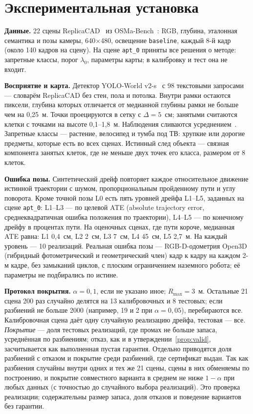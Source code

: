\section{Экспериментальная установка}\label{sec:setup}

\textbf{Данные.} 22 сцены ReplicaCAD~\cite{habitat2} из OSMa-Bench~\cite{osmabench}: RGB, глубина, эталонная семантика и позы камеры, 640$\times$480, освещение \texttt{baseline}, каждый 8-й кадр (около 140 кадров на сцену). На сцене \texttt{apt\_0} приняты все решения о методе: запретные классы, порог $\lambda_0$, параметры карты; в калибровку и тест она не входит.

\textbf{Восприятие и карта.} Детектор YOLO-World v2-s~\cite{yoloworld} с 98 текстовыми запросами --- словарём ReplicaCAD без стен, пола и потолка. Внутри рамки остаются пиксели, глубина которых отличается от медианной глубины рамки не больше чем на 0,25~м. Точки проецируются в сетку с $\Delta = 5$~см; занятыми считаются клетки с точками на высоте 0,1--1,8~м. Наблюдения сливаются усреднением~\cite{overconf}. Запретные классы --- растение, велосипед и тумба под ТВ: хрупкие или дорогие предметы, которые есть во всех сценах. Истинный след объекта --- связная компонента занятых клеток, где не меньше двух точек его класса, размером от 8 клеток.

\textbf{Ошибка позы.} Синтетический дрейф повторяет каждое относительное движение истинной траектории с шумом, пропорциональным пройденному пути и углу поворота. Кроме точной позы L0 есть пять уровней дрейфа L1--L5, заданных на сцене \texttt{apt\_0}: L1--L3 --- по целевой ATE (absolute trajectory error, среднеквадратичная ошибка положения по траектории), L4--L5 --- по конечному дрейфу в процентах пути. На оценочных сценах, где пути короче, медианная ATE равна: L1 0,4~см, L2 2~см, L3 7~см, L4 45~см, L5 2,7~м. На каждый уровень --- 10 реализаций. Реальная ошибка позы --- RGB-D-одометрия Open3D~\cite{open3d} (гибридный фотометрический и геометрический член) кадр к кадру на каждом 2-м кадре, без замыканий циклов, с плоским ограничением наземного робота; её параметры не подбирались по истине.

\textbf{Протокол покрытия.} $\alpha = 0{,}1$, если не указано иное; $R_{\max} = 3$~м. Остальные 21 сцена 200 раз случайно делятся на 13 калибровочных и 8 тестовых; если разбиений не больше 2000 (например, 19 и 2 при $\alpha = 0{,}05$), перебираются все. Калибровочная сцена даёт одну случайную реализацию дрейфа, тестовая --- все. \emph{Покрытие} --- доля тестовых реализаций, где промах не больше запаса, усреднённая по разбиениям; отказ, как и в утверждении~\ref{prop:valid}, засчитывается как выполненная пустая гарантия. Отдельно приводятся доля разбиений с отказом и покрытие среди разбиений, где сертификат выдан. Так как разбиения случайны внутри одних и тех же 21 сцены, сцены в них обменяемы по построению, и покрытие совместного варианта в среднем не ниже $1 - \alpha$ при любых данных (с точностью до случайного выбора реализаций). Это проверка реализации; содержательны размер запаса, доля отказов и поведение вариантов без гарантии.

